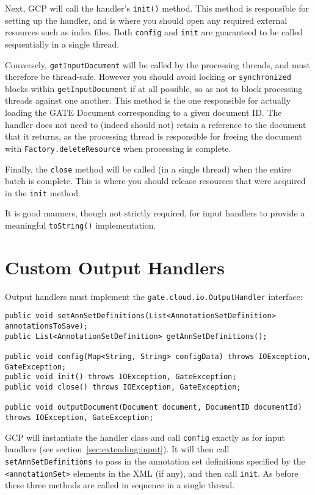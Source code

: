 Next, GCP will call the handler's \verb!init()! method.  This method is
responsible for setting up the handler, and is where you should open any
required external resources such as index files.  Both \verb!config! and
\verb!init! are guaranteed to be called sequentially in a single thread.

Conversely, \verb!getInputDocument! will be called by the processing threads,
and must therefore be thread-safe.  However you should avoid locking or
\verb!synchronized! blocks within \verb!getInputDocument! if at all possible,
so as not to block processing threads against one another.  This method is the
one responsible for actually loading the GATE Document corresponding to a given
document ID.  The handler does not need to (indeed should not) retain a
reference to the document that it returns, as the processing thread is
responsible for freeing the document with \verb!Factory.deleteResource! when
processing is complete.

Finally, the \verb!close! method will be called (in a single thread) when the
entire batch is complete.  This is where you should release resources that were
acquired in the \verb!init! method.

It is good manners, though not strictly required, for input handlers to provide
a meaningful \verb!toString()! implementation.

\section{Custom Output Handlers}

Output handlers must implement the \verb!gate.cloud.io.OutputHandler!
interface:

\begin{lstlisting}[breaklines]
public void setAnnSetDefinitions(List<AnnotationSetDefinition> annotationsToSave);
public List<AnnotationSetDefinition> getAnnSetDefinitions();

public void config(Map<String, String> configData) throws IOException, GateException;
public void init() throws IOException, GateException;
public void close() throws IOException, GateException;

public void outputDocument(Document document, DocumentID documentId) throws IOException, GateException;
\end{lstlisting}

GCP will instantiate the handler class and call \verb!config! exactly as for
input handlers (see section~\ref{sec:extending:input}).  It will then call
\verb!setAnnSetDefinitions! to pass in the annotation set definitions specified
by the \verb!<annotationSet>! elements in the XML (if any), and then call
\verb!init!.  As before these three methods are called in sequence in a single
thread.

